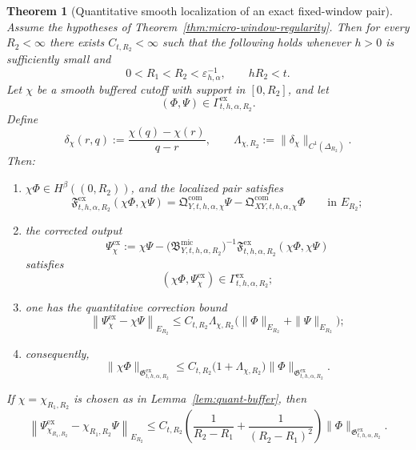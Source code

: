 \documentclass[11pt,a4paper]{amsart}
\theoremstyle{plain}
\newtheorem{theorem}{Theorem}[section]
\theoremstyle{definition}
\theoremstyle{remark}
\begin{document}
\begin{theorem}[Quantitative smooth localization of an exact fixed-window pair]
\label{thm:quant-window-buffer}
Assume the hypotheses of Theorem~\ref{thm:micro-window-regularity}. Then for every \(R_2<\infty\)
there exists \(C_{t,R_2}<\infty\) such that the following holds whenever \(h>0\) is sufficiently
small and
\[
0<R_1<R_2<\varepsilon_{h,\alpha}^{-1},\qquad hR_2<t.
\]
Let \(\chi\) be a smooth buffered cutoff with support in \([0,R_2]\), and let
\[
(\Phi,\Psi)\in\Gamma_{t,h,\alpha,R_2}^{\mathrm{ex}}.
\]
Define
\[
\delta_{\chi}(r,q):=\frac{\chi(q)-\chi(r)}{q-r},
\qquad
\Lambda_{\chi,R_2}:=\|\delta_{\chi}\|_{C^1(\Delta_{R_2})}.
\]
Then:
\begin{enumerate}[label=(\roman*)]
\item \(\chi\Phi\in H^\beta((0,R_2))\), and the localized pair satisfies
\begin{equation}\label{eq:quant-window-defect}
\mathfrak F_{t,h,\alpha,R_2}^{\mathrm{ex}}(\chi\Phi,\chi\Psi)
=
\mathfrak Q_{Y,t,h,\alpha,\chi}^{\mathrm{com}}\Psi
-
\mathfrak Q_{XY,t,h,\alpha,\chi}^{\mathrm{com}}\Phi
\qquad\text{in }E_{R_2};
\end{equation}
\item the corrected output
\begin{equation}\label{eq:quant-window-corrected}
\Psi_{\chi}^{\mathrm{ex}}
:=
\chi\Psi
-
\bigl(\mathfrak B_{Y,t,h,\alpha,R_2}^{\mathrm{mic}}\bigr)^{-1}
\mathfrak F_{t,h,\alpha,R_2}^{\mathrm{ex}}(\chi\Phi,\chi\Psi)
\end{equation}
satisfies
\[
(\chi\Phi,\Psi_{\chi}^{\mathrm{ex}})
\in
\Gamma_{t,h,\alpha,R_2}^{\mathrm{ex}};
\]
\item one has the quantitative correction bound
\begin{equation}\label{eq:quant-window-correction}
\left\|
\Psi_{\chi}^{\mathrm{ex}}-\chi\Psi
\right\|_{E_{R_2}}
\le
C_{t,R_2}\Lambda_{\chi,R_2}
\bigl(
\|\Phi\|_{E_{R_2}}+\|\Psi\|_{E_{R_2}}
\bigr);
\end{equation}
\item consequently,
\begin{equation}\label{eq:quant-window-graph}
\|\chi\Phi\|_{\mathfrak G_{t,h,\alpha,R_2}^{\mathrm{ex}}}
\le
C_{t,R_2}
\bigl(1+\Lambda_{\chi,R_2}\bigr)
\|\Phi\|_{\mathfrak G_{t,h,\alpha,R_2}^{\mathrm{ex}}}.
\end{equation}
\end{enumerate}
If \(\chi=\chi_{R_1,R_2}\) is chosen as in Lemma~\ref{lem:quant-buffer}, then
\begin{equation}\label{eq:quant-window-correction-width}
\left\|
\Psi_{\chi_{R_1,R_2}}^{\mathrm{ex}}-\chi_{R_1,R_2}\Psi
\right\|_{E_{R_2}}
\le
C_{t,R_2}
\left(
\frac{1}{R_2-R_1}
+
\frac{1}{(R_2-R_1)^2}
\right)
\|\Phi\|_{\mathfrak G_{t,h,\alpha,R_2}^{\mathrm{ex}}}.
\end{equation}
\end{theorem}
\end{document}
